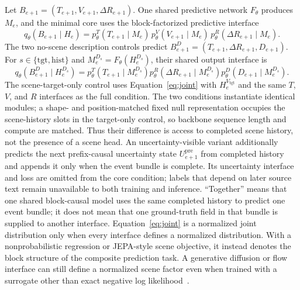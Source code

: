 \documentclass[11pt]{article}
\begin{document}
Let $B_{e+1}=(T_{e+1},V_{e+1},\Delta R_{e+1})$. One shared predictive network $F_\theta$ produces $M_e$, and the minimal core uses the block-factorized predictive interface
\begin{equation}
  q_\theta(B_{e+1}\mid H_e)
  =p_\theta^T(T_{e+1}\mid M_e)\,
   p_\theta^V(V_{e+1}\mid M_e)\,
   p_\theta^R(\Delta R_{e+1}\mid M_e).
  \label{eq:joint}
\end{equation}
The two no-scene description controls predict $B_{e+1}^D=(T_{e+1},\Delta R_{e+1},D_{e+1})$. For $s\in\{\mathrm{tgt},\mathrm{hist}\}$ and $M_e^{D_s}=F_\theta(H_e^{D_s})$, their shared output interface is
\begin{equation}
  q_\theta(B_{e+1}^D\mid H_e^{D_s})
  =p_\theta^T(T_{e+1}\mid M_e^{D_s})
   p_\theta^R(\Delta R_{e+1}\mid M_e^{D_s})
   p_\theta^D(D_{e+1}\mid M_e^{D_s}).
  \label{eq:description-controls}
\end{equation}
The scene-target-only control uses Equation~\ref{eq:joint} with $H_e^{V_{\mathrm{tgt}}}$ and the same $T$, $V$, and $R$ interfaces as the full condition. The two conditions instantiate identical modules; a shape- and position-matched fixed null representation occupies the scene-history slots in the target-only control, so backbone sequence length and compute are matched. Thus their difference is access to completed scene history, not the presence of a scene head.
An uncertainty-visible variant additionally predicts the next prefix-causal uncertainty state $U_{e+1}^{\mathrm{pre}}$ from completed history and appends it only when the event bundle is complete. Its uncertainty interface and loss are omitted from the core condition; labels that depend on later source text remain unavailable to both training and inference.
``Together'' means that one shared block-causal model uses the same completed history to predict one event bundle; it does not mean that one ground-truth field in that bundle is supplied to another interface. Equation~\ref{eq:joint} is a normalized joint distribution only when every interface defines a normalized distribution. With a nonprobabilistic regression or JEPA-style scene objective, it instead denotes the block structure of the composite prediction task. A generative diffusion or flow interface can still define a normalized scene factor even when trained with a surrogate other than exact negative log likelihood~\cite{emu3,tv2tv,vjepa2}.
\end{document}

